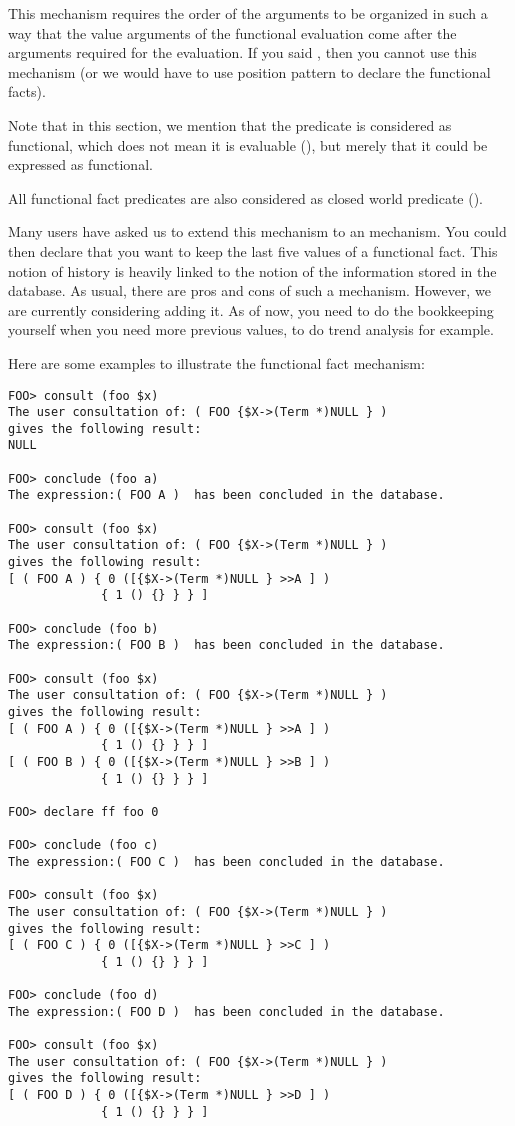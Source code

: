 This mechanism requires the order of the arguments to be organized in such
a way that the value arguments of the functional evaluation come after
the arguments required for the evaluation. If you said
, then you cannot use this mechanism (or we would
have to use position pattern to declare the functional facts).

Note that in this section, we mention that the predicate is considered as
functional, which does not mean it is evaluable (), but merely that it could be expressed as functional.

All functional fact predicates are also considered as closed world predicate
().

Many users have asked us to extend this mechanism to an 
mechanism. You could then declare that you want to keep the last five
values of a functional fact. This notion of history is heavily linked to
the notion of  the information stored in the database.
As usual, there are pros and cons of such a mechanism. However, we are
currently considering adding it. As of now, you need to do the bookkeeping
yourself when you need more previous values, to do trend analysis for
example.

Here are some examples to illustrate the functional fact mechanism:

\begin{verbatim}
FOO> consult (foo $x)
The user consultation of: ( FOO {$X->(Term *)NULL } )
gives the following result:
NULL

FOO> conclude (foo a)
The expression:( FOO A )  has been concluded in the database.

FOO> consult (foo $x)
The user consultation of: ( FOO {$X->(Term *)NULL } )
gives the following result:
[ ( FOO A ) { 0 ([{$X->(Term *)NULL } >>A ] )
             { 1 () {} } } ]

FOO> conclude (foo b)
The expression:( FOO B )  has been concluded in the database.

FOO> consult (foo $x)
The user consultation of: ( FOO {$X->(Term *)NULL } )
gives the following result:
[ ( FOO A ) { 0 ([{$X->(Term *)NULL } >>A ] )
             { 1 () {} } } ]
[ ( FOO B ) { 0 ([{$X->(Term *)NULL } >>B ] )
             { 1 () {} } } ]

FOO> declare ff foo 0

FOO> conclude (foo c)
The expression:( FOO C )  has been concluded in the database.

FOO> consult (foo $x)
The user consultation of: ( FOO {$X->(Term *)NULL } )
gives the following result:
[ ( FOO C ) { 0 ([{$X->(Term *)NULL } >>C ] )
             { 1 () {} } } ]

FOO> conclude (foo d)
The expression:( FOO D )  has been concluded in the database.

FOO> consult (foo $x)
The user consultation of: ( FOO {$X->(Term *)NULL } )
gives the following result:
[ ( FOO D ) { 0 ([{$X->(Term *)NULL } >>D ] )
             { 1 () {} } } ]
\end{verbatim}

